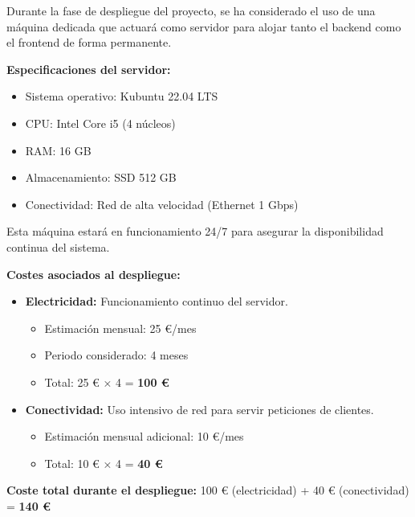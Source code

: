Durante la fase de despliegue del proyecto, se ha considerado el uso de una máquina dedicada que actuará como servidor para alojar tanto el backend como el frontend de forma permanente.

\textbf{Especificaciones del servidor:}
\begin{itemize}
    \item Sistema operativo: Kubuntu 22.04 LTS
    \item CPU: Intel Core i5 (4 núcleos)
    \item RAM: 16 GB
    \item Almacenamiento: SSD 512 GB
    \item Conectividad: Red de alta velocidad (Ethernet 1 Gbps)
\end{itemize}

Esta máquina estará en funcionamiento 24/7 para asegurar la disponibilidad continua del sistema.

\textbf{Costes asociados al despliegue:}
\begin{itemize}
    \item \textbf{Electricidad:} Funcionamiento continuo del servidor.
    \begin{itemize}
        \item Estimación mensual: 25 €/mes
        \item Periodo considerado: 4 meses
        \item Total: 25 € × 4 = \textbf{100 €}
    \end{itemize}
    \item \textbf{Conectividad:} Uso intensivo de red para servir peticiones de clientes.
    \begin{itemize}
        \item Estimación mensual adicional: 10 €/mes
        \item Total: 10 € × 4 = \textbf{40 €}
    \end{itemize}
\end{itemize}

\textbf{Coste total durante el despliegue:} 100 € (electricidad) + 40 € (conectividad) = \textbf{140 €}
